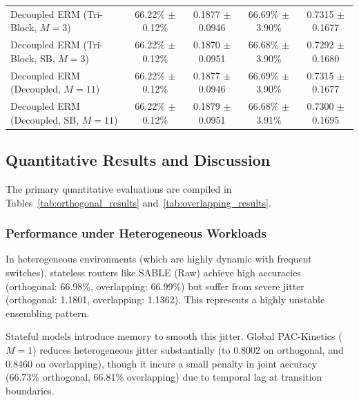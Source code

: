 \begin{table}[t]
\begin{center}
\begin{small}
\begin{sc}
\begin{tabular}{lcccc}
\midrule
Decoupled ERM (Tri-Block, $M=3$) & 66.22\% $\pm$ 0.12\% & 0.1877 $\pm$ 0.0946 & 66.69\% $\pm$ 3.90\% & 0.7315 $\pm$ 0.1677 \\
Decoupled ERM (Tri-Block, SB, $M=3$) & 66.22\% $\pm$ 0.12\% & 0.1870 $\pm$ 0.0951 & 66.68\% $\pm$ 3.90\% & 0.7292 $\pm$ 0.1680 \\
Decoupled ERM (Decoupled, $M=11$) & 66.22\% $\pm$ 0.12\% & 0.1877 $\pm$ 0.0946 & 66.69\% $\pm$ 3.90\% & 0.7315 $\pm$ 0.1677 \\
Decoupled ERM (Decoupled, SB, $M=11$) & 66.22\% $\pm$ 0.12\% & 0.1879 $\pm$ 0.0951 & 66.68\% $\pm$ 3.91\% & 0.7300 $\pm$ 0.1695 \\
\bottomrule
\end{tabular}
\end{sc}
\end{small}
\end{center}
\end{table}

\subsection{Quantitative Results and Discussion}
The primary quantitative evaluations are compiled in Tables~\ref{tab:orthogonal_results} and~\ref{tab:overlapping_results}.

\subsubsection{Performance under Heterogeneous Workloads}
In heterogeneous environments (which are highly dynamic with frequent switches), stateless routers like SABLE (Raw) achieve high accuracies (orthogonal: 66.98\%, overlapping: 66.99\%) but suffer from severe jitter (orthogonal: 1.1801, overlapping: 1.1362). This represents a highly unstable ensembling pattern. 

Stateful models introduce memory to smooth this jitter. Global PAC-Kinetics ($M=1$) reduces heterogeneous jitter substantially (to 0.8002 on orthogonal, and 0.8460 on overlapping), though it incurs a small penalty in joint accuracy (66.73\% orthogonal, 66.81\% overlapping) due to temporal lag at transition boundaries.

